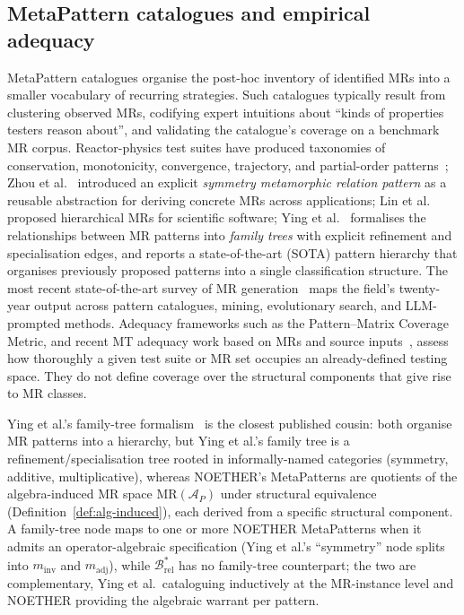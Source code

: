 \documentclass[acmsmall,screen,review]{acmart}
\begin{document}
\subsection{MetaPattern catalogues and empirical adequacy}

MetaPattern catalogues organise the post-hoc inventory of identified MRs into a smaller vocabulary of recurring strategies. Such catalogues typically result from clustering observed MRs, codifying expert intuitions about ``kinds of properties testers reason about'', and validating the catalogue's coverage on a benchmark MR corpus. Reactor-physics test suites have produced taxonomies of conservation, monotonicity, convergence, trajectory, and partial-order patterns~\cite{BellGlasstone1970, LewisMiller1993}; Zhou et al.~\cite{Zhou2020SymmetryMRP} introduced an explicit \emph{symmetry metamorphic relation pattern} as a reusable abstraction for deriving concrete MRs across applications; Lin et al.~\cite{Lin2018HierarchicalMR} proposed hierarchical MRs for scientific software; Ying et al.~\cite{Ying2025MRPatterns} formalises the relationships between MR patterns into \emph{family trees} with explicit refinement and specialisation edges, and reports a state-of-the-art (SOTA) pattern hierarchy that organises previously proposed patterns into a single classification structure. The most recent state-of-the-art survey of MR generation~\cite{LiTOSEM2025} maps the field's twenty-year output across pattern catalogues, mining, evolutionary search, and LLM-prompted methods. Adequacy frameworks such as the Pattern--Matrix Coverage Metric, and recent MT adequacy work based on MRs and source inputs~\cite{Fu2024MTAdequacy}, assess how thoroughly a given test suite or MR set occupies an already-defined testing space. They do not define coverage over the structural components that give rise to MR classes.

Ying et al.'s family-tree formalism~\cite{Ying2025MRPatterns} is the closest published cousin: both organise MR patterns into a hierarchy, but Ying et al.'s family tree is a refinement/specialisation tree rooted in informally-named categories (symmetry, additive, multiplicative), whereas NOETHER's MetaPatterns are quotients of the algebra-induced MR space $\mathrm{MR}(\mathcal{A}_P)$ under structural equivalence (Definition~\ref{def:alg-induced}), each derived from a specific structural component. A family-tree node maps to one or more NOETHER MetaPatterns when it admits an operator-algebraic specification (Ying et al.'s ``symmetry'' node splits into $m_{\mathrm{inv}}$ and $m_{\mathrm{adj}}$), while $\mathcal{B}^{*}_{\mathrm{rel}}$ has no family-tree counterpart; the two are complementary, Ying et al.\ cataloguing inductively at the MR-instance level and NOETHER providing the algebraic warrant per pattern.
\end{document}

